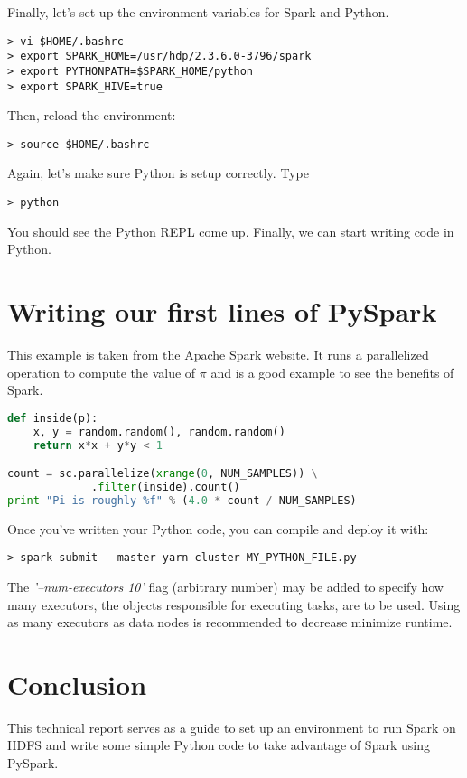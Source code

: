 \documentclass[9pt,twocolumn,twoside]{idsi}
\begin{document}
\noindent
Finally, let's set up the environment variables for Spark and Python.
\begin{verbatim}
> vi $HOME/.bashrc
> export SPARK_HOME=/usr/hdp/2.3.6.0-3796/spark
> export PYTHONPATH=$SPARK_HOME/python
> export SPARK_HIVE=true
\end{verbatim}

\noindent
Then, reload the environment:
\begin{verbatim}
> source $HOME/.bashrc
\end{verbatim}

Again, let's make sure Python is setup correctly. Type
\begin{verbatim}
> python
\end{verbatim}
You should see the Python REPL come up. Finally, we can start writing code in Python.

\section{Writing our first lines of PySpark}

This example is taken from the Apache Spark website. It runs a parallelized operation to compute the value of $\pi$ and is a good example to see the benefits of Spark.
\begin{lstlisting}[language=python]
def inside(p):
    x, y = random.random(), random.random()
    return x*x + y*y < 1

count = sc.parallelize(xrange(0, NUM_SAMPLES)) \
             .filter(inside).count()
print "Pi is roughly %f" % (4.0 * count / NUM_SAMPLES)
\end{lstlisting}

Once you've written your Python code, you can compile and deploy it with:
\begin{verbatim}
> spark-submit --master yarn-cluster MY_PYTHON_FILE.py
\end{verbatim}

\noindent
The \textit{'--num-executors 10'} flag (arbitrary number) may be added to specify how many executors, the objects responsible for executing tasks, are to be used. Using as many executors as data nodes is recommended to decrease minimize runtime.

\section{Conclusion}

This technical report serves as a guide to set up an environment to run Spark on HDFS and write some simple Python code to take advantage of Spark using PySpark.
\end{document}
